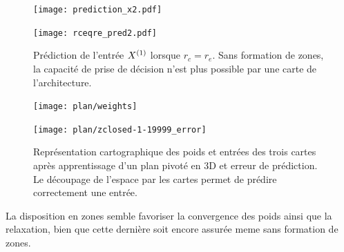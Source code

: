 \documentclass[../main]{subfiles}
\begin{document}
\begin{figure}
	\texttt{[image: prediction\_x2.pdf]}
	\caption{\label{fig:pred_cercle}}
\end{figure}

\begin{figure}
	\texttt{[image: rceqre\_pred2.pdf]}
	\caption{Prédiction de l'entrée $X^{({1})}$ lorsque $r_c = r_e$. Sans formation de zones, la capacité de prise de décision n'est plus possible par une carte de l'architecture. \label{fig:rcre_pred}}
\end{figure}



\begin{figure}
	\begin{minipage}{0.48\textwidth}
	\centering\texttt{[image: plan/weights]}
	\end{minipage}
	\begin{minipage}{0.48\textwidth}
	\texttt{[image: plan/zclosed-1-19999\_error]}	
	\end{minipage}	
	\caption{Représentation cartographique des poids et entrées des trois cartes après apprentissage d'un plan pivoté en 3D et erreur de prédiction. Le découpage de l'espace par les cartes permet de prédire correctement une entrée. \label{fig:plan3}}
	\end{figure}

La disposition en zones semble favoriser la convergence des poids ainsi que la relaxation, bien que cette dernière soit encore assurée meme sans formation de zones.
\end{document}
